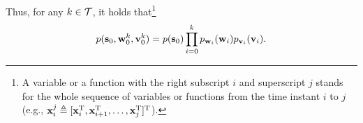 \documentclass[conference,10pt]{IEEEtran}
\begin{document}
Thus, for any $k\in\mathcal{T}$, it holds that\footnote{A variable or a function with the right subscript $i$ and superscript $j$ stands for the whole sequence of variables or functions from the time instant $i$ to $j$ (e.g., $\mathbf{x}_{i}^{j} \triangleq [\mathbf{x}_{i}^{\text{T}},\mathbf{x}_{i+1}^{\text{T}},\ldots,\mathbf{x}_{j}^{\text{T}}]^{\text{T}}$).}
\begin{align}\label{ali:independence}
	p(\mathbf{s}_{0},\mathbf{w}_{0}^{k},\mathbf{v}_{0}^{k}) =	p(\mathbf{s}_{0})\prod_{i=0}^{k} p_{\mathbf{w}_{i}}(\mathbf{w}_{i})p_{\mathbf{v}_{i}}(\mathbf{v}_{i}).
\end{align}

\end{document}
